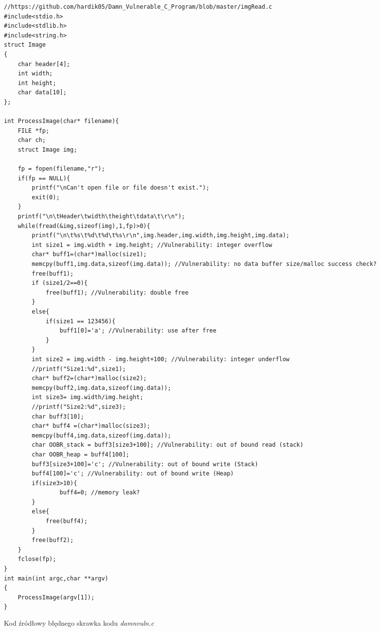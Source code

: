 

\begin{listing}
  \begin{verbatim}
//https://github.com/hardik05/Damn_Vulnerable_C_Program/blob/master/imgRead.c
#include<stdio.h>
#include<stdlib.h>
#include<string.h>
struct Image
{
	char header[4];
	int width;
	int height;
	char data[10];
};

int ProcessImage(char* filename){
	FILE *fp;
	char ch;
	struct Image img;

	fp = fopen(filename,"r"); 
	if(fp == NULL){
		printf("\nCan't open file or file doesn't exist.");
		exit(0);
	}
	printf("\n\tHeader\twidth\theight\tdata\t\r\n");
	while(fread(&img,sizeof(img),1,fp)>0){
		printf("\n\t%s\t%d\t%d\t%s\r\n",img.header,img.width,img.height,img.data);
		int size1 = img.width + img.height; //Vulnerability: integer overflow
		char* buff1=(char*)malloc(size1);
		memcpy(buff1,img.data,sizeof(img.data)); //Vulnerability: no data buffer size/malloc success check?
		free(buff1);
		if (size1/2==0){
			free(buff1); //Vulnerability: double free
		}
		else{
			if(size1 == 123456){
				buff1[0]='a'; //Vulnerability: use after free
			}
		}
		int size2 = img.width - img.height+100; //Vulnerability: integer underflow
		//printf("Size1:%d",size1);
		char* buff2=(char*)malloc(size2);
		memcpy(buff2,img.data,sizeof(img.data));
		int size3= img.width/img.height;
		//printf("Size2:%d",size3);
		char buff3[10];
		char* buff4 =(char*)malloc(size3);
		memcpy(buff4,img.data,sizeof(img.data));
		char OOBR_stack = buff3[size3+100]; //Vulnerability: out of bound read (stack)
		char OOBR_heap = buff4[100];
		buff3[size3+100]='c'; //Vulnerability: out of bound write (Stack)
		buff4[100]='c'; //Vulnerability: out of bound write (Heap)
		if(size3>10){
				buff4=0; //memory leak?
		}
		else{
			free(buff4);
		}
		free(buff2);
	}
	fclose(fp);
}
int main(int argc,char **argv)
{
	ProcessImage(argv[1]);
}
\end{verbatim}
\caption{Kod źródłowy błędnego skrawka kodu \textit{damnvuln.c}}
\label{lst:code1}
\end{listing}
\restoregeometry


